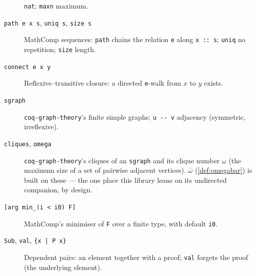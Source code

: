 \begin{description}
  \texttt{nat}; \texttt{maxn} maximum.
\item[\texttt{path e x s}, \texttt{uniq s}, \texttt{size s}]
  MathComp sequences: \texttt{path} chains the relation \texttt{e}
  along \texttt{x :: s}; \texttt{uniq} no repetition; \texttt{size}
  length.
\item[\texttt{connect e x y}] Reflexive--transitive closure: a
  directed \texttt{e}-walk from $x$ to $y$ exists.
\item[\texttt{sgraph}] \texttt{coq-graph-theory}'s finite simple
  graphs; \texttt{u -{}- v} adjacency (symmetric, irreflexive).
\item[\texttt{cliques}, \texttt{omega}]
  \texttt{coq-graph-theory}'s cliques of an \texttt{sgraph} and its
  clique number $\omega$ (the maximum size of a set of pairwise
  adjacent vertices). $\bar\omega$ (\cref{def:omegabar}) is built on
  these --- the one place this library leans on its undirected
  companion, by design.
\item[{\texttt{[arg min\_(i < i0) F]}}] MathComp's minimiser of
  \texttt{F} over a finite type, with default \texttt{i0}.
\item[{\texttt{Sub}, \texttt{val}, \texttt{\{x | P x\}}}]
  Dependent pairs: an element together with a proof; \texttt{val}
  forgets the proof (the underlying element).
\end{description}
